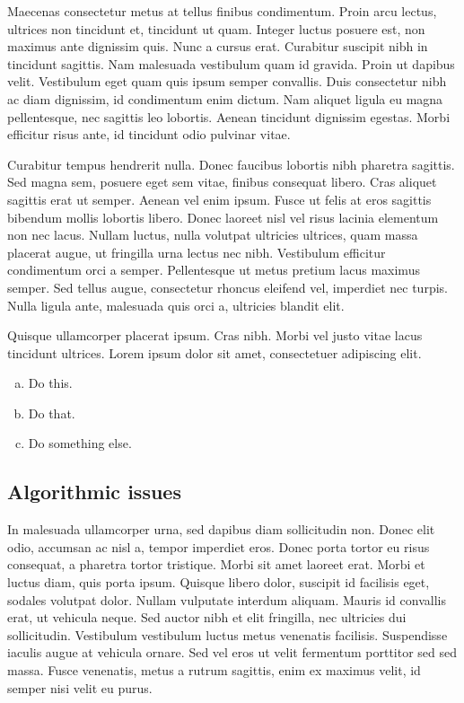 \documentclass{article}
\begin{document}
Maecenas consectetur metus at tellus finibus condimentum. Proin arcu lectus, ultrices non tincidunt et, tincidunt ut quam. Integer luctus posuere est, non maximus ante dignissim quis. Nunc a cursus erat. Curabitur suscipit nibh in tincidunt sagittis. Nam malesuada vestibulum quam id gravida. Proin ut dapibus velit. Vestibulum eget quam quis ipsum semper convallis. Duis consectetur nibh ac diam dignissim, id condimentum enim dictum. Nam aliquet ligula eu magna pellentesque, nec sagittis leo lobortis. Aenean tincidunt dignissim egestas. Morbi efficitur risus ante, id tincidunt odio pulvinar vitae.

Curabitur tempus hendrerit nulla. Donec faucibus lobortis nibh pharetra sagittis. Sed magna sem, posuere eget sem vitae, finibus consequat libero. Cras aliquet sagittis erat ut semper. Aenean vel enim ipsum. Fusce ut felis at eros sagittis bibendum mollis lobortis libero. Donec laoreet nisl vel risus lacinia elementum non nec lacus. Nullam luctus, nulla volutpat ultricies ultrices, quam massa placerat augue, ut fringilla urna lectus nec nibh. Vestibulum efficitur condimentum orci a semper. Pellentesque ut metus pretium lacus maximus semper. Sed tellus augue, consectetur rhoncus eleifend vel, imperdiet nec turpis. Nulla ligula ante, malesuada quis orci a, ultricies blandit elit.

\begin{question}
	Quisque ullamcorper placerat ipsum. Cras nibh. Morbi vel justo vitae lacus tincidunt ultrices. Lorem ipsum dolor sit amet, consectetuer adipiscing elit.

	\begin{enumerate}[(a)]
		\item Do this.
		\item Do that.
		\item Do something else.
	\end{enumerate}
\end{question}
	

\subsection{Algorithmic issues}

In malesuada ullamcorper urna, sed dapibus diam sollicitudin non. Donec elit odio, accumsan ac nisl a, tempor imperdiet eros. Donec porta tortor eu risus consequat, a pharetra tortor tristique. Morbi sit amet laoreet erat. Morbi et luctus diam, quis porta ipsum. Quisque libero dolor, suscipit id facilisis eget, sodales volutpat dolor. Nullam vulputate interdum aliquam. Mauris id convallis erat, ut vehicula neque. Sed auctor nibh et elit fringilla, nec ultricies dui sollicitudin. Vestibulum vestibulum luctus metus venenatis facilisis. Suspendisse iaculis augue at vehicula ornare. Sed vel eros ut velit fermentum porttitor sed sed massa. Fusce venenatis, metus a rutrum sagittis, enim ex maximus velit, id semper nisi velit eu purus.
\end{document}

